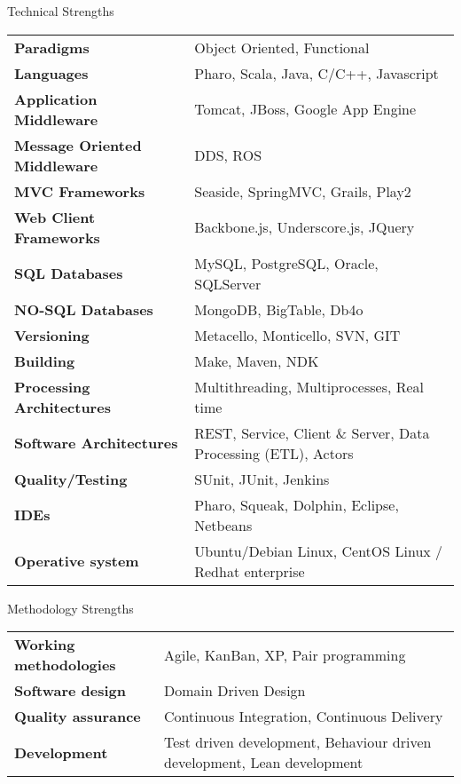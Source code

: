 \documentclass{resume} %
\begin{document}
\begin{rSection}{Technical Strengths}
	\begin{tabular}{ @{} >{\bfseries}l @{\hspace{6ex}} l }
		Paradigms & Object Oriented, Functional \\
		Languages & Pharo, Scala, Java, C/C++, Javascript  \\
		Application Middleware & Tomcat, JBoss, Google App Engine \\
		Message Oriented Middleware & DDS, ROS \\
		MVC Frameworks &  Seaside, SpringMVC, Grails, Play2 \\
		Web Client Frameworks & Backbone.js, Underscore.js, JQuery \\
		SQL Databases & MySQL, PostgreSQL, Oracle, SQLServer  \\
		NO-SQL Databases & MongoDB, BigTable, Db4o  \\
		Versioning & Metacello, Monticello, SVN, GIT \\
		Building & Make, Maven, NDK \\
		Processing Architectures & Multithreading, Multiprocesses, Real time \\
		Software Architectures & REST, Service,  Client \& Server, Data Processing (ETL), Actors\\
		Quality/Testing & SUnit, JUnit, Jenkins \\
		IDEs & Pharo, Squeak, Dolphin, Eclipse, Netbeans \\
		Operative system & Ubuntu/Debian Linux, CentOS Linux / Redhat enterprise \\
	\end{tabular}
\end{rSection}

\begin{rSection}{Methodology Strengths}

\begin{tabular}{ @{} >{\bfseries}l @{\hspace{6ex}} l }
	Working methodologies & Agile, KanBan, XP, Pair programming  \\
	Software design & Domain Driven Design  \\
	Quality assurance & Continuous Integration, Continuous Delivery \\
	Development & Test driven development, Behaviour driven development, Lean development \\
\end{tabular}

\end{rSection}
\end{document}
